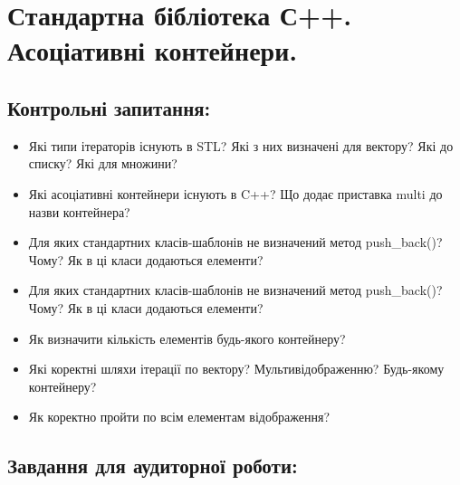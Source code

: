 \documentclass[a5paper,titlepage,openany,twoside,
]
{book_unv}%
\begin{document}
\chapter{Стандартна бібліотека С++. Асоціативні контейнери.}
%

\section{Контрольні запитання:}
\begin{itemize}
\item
Які типи ітераторів існують в STL? Які з них визначені для вектору? Які
до списку? Які для множини?
\item
Які асоціативні контейнери існують в C++? Що додає приставка multi до
назви контейнера?
\item
Для яких стандартних класів-шаблонів не визначений метод push\_back()?
Чому? Як в ці класи додаються елементи?
\item
Для яких стандартних класів-шаблонів не визначений метод push\_back()?
Чому? Як в ці класи додаються елементи?
\item
Як визначити кількість елементів будь-якого контейнеру?
\item
Які коректні шляхи ітерації по вектору? Мультивідображенню? Будь-якому
контейнеру?
\item
Як коректно пройти по всім елементам відображення?
\end{itemize}

\section{Завдання для аудиторної роботи:}
\end{document}

